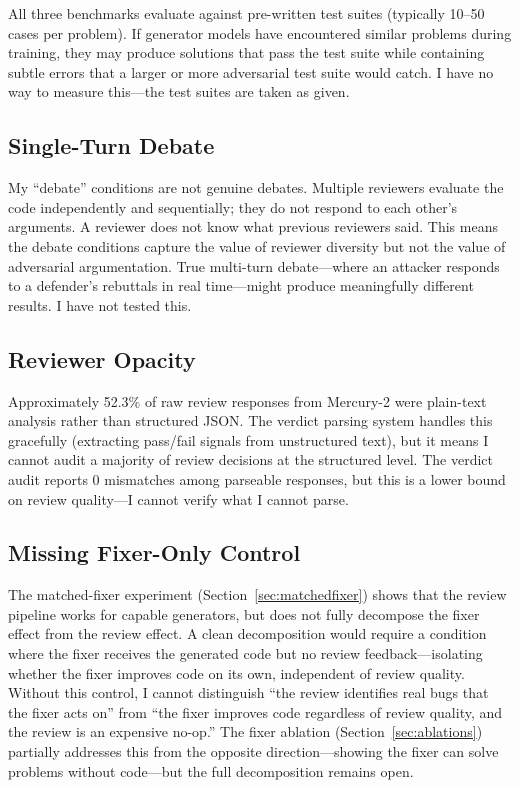 \documentclass{article}
\begin{document}
All three benchmarks evaluate against pre-written test suites (typically 10--50 cases per problem). If generator models have encountered similar problems during training, they may produce solutions that pass the test suite while containing subtle errors that a larger or more adversarial test suite would catch. I have no way to measure this---the test suites are taken as given.

\subsection{Single-Turn Debate}

My ``debate'' conditions are not genuine debates. Multiple reviewers evaluate the code independently and sequentially; they do not respond to each other's arguments. A reviewer does not know what previous reviewers said. This means the debate conditions capture the value of reviewer diversity but not the value of adversarial argumentation. True multi-turn debate---where an attacker responds to a defender's rebuttals in real time---might produce meaningfully different results. I have not tested this.

\subsection{Reviewer Opacity}

Approximately 52.3\% of raw review responses from Mercury-2 were plain-text analysis rather than structured JSON. The verdict parsing system handles this gracefully (extracting pass/fail signals from unstructured text), but it means I cannot audit a majority of review decisions at the structured level. The verdict audit reports 0 mismatches among parseable responses, but this is a lower bound on review quality---I cannot verify what I cannot parse.

\subsection{Missing Fixer-Only Control}

The matched-fixer experiment (Section~\ref{sec:matchedfixer}) shows that the review pipeline works for capable generators, but does not fully decompose the fixer effect from the review effect. A clean decomposition would require a condition where the fixer receives the generated code but no review feedback---isolating whether the fixer improves code on its own, independent of review quality. Without this control, I cannot distinguish ``the review identifies real bugs that the fixer acts on'' from ``the fixer improves code regardless of review quality, and the review is an expensive no-op.'' The fixer ablation (Section~\ref{sec:ablations}) partially addresses this from the opposite direction---showing the fixer can solve problems without code---but the full decomposition remains open.
\end{document}
